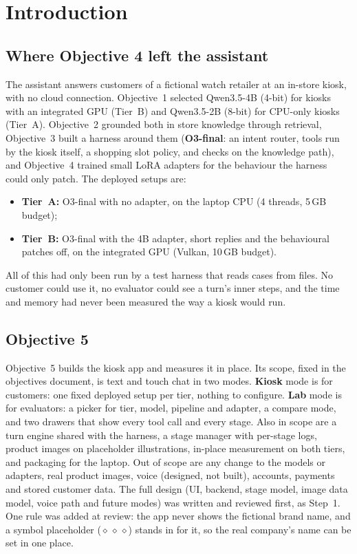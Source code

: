 \documentclass[11pt,a4paper]{article}
\newcommand{\brand}{$\diamond\,\diamond\,\diamond$}
\begin{document}
\section{Introduction}\label{sec:intro}

\subsection{Where Objective 4 left the assistant}
The assistant answers customers of a fictional watch retailer at an in-store kiosk, with no cloud connection. Objective~1
selected Qwen3.5-4B (4-bit) for kiosks with an integrated GPU (Tier~B) and Qwen3.5-2B (8-bit) for CPU-only kiosks
(Tier~A). Objective~2 grounded both in store knowledge through retrieval, Objective~3 built a harness around them
(\textbf{O3-final}: an intent router, tools run by the kiosk itself, a shopping slot policy, and checks on the knowledge
path), and Objective~4 trained small LoRA adapters for the behaviour the harness could only patch. The deployed setups are:
\begin{itemize}
  \item \textbf{Tier~A:} O3-final with no adapter, on the laptop CPU (4 threads, 5\,GB budget);
  \item \textbf{Tier~B:} O3-final with the 4B adapter, short replies and the behavioural patches off, on the integrated
        GPU (Vulkan, 10\,GB budget).
\end{itemize}
All of this had only been run by a test harness that reads cases from files. No customer could use it, no evaluator
could see a turn's inner steps, and the time and memory had never been measured the way a kiosk would run.

\subsection{Objective 5}
Objective~5 builds the kiosk app and measures it in place. Its scope, fixed in the objectives document, is text and touch
chat in two modes. \textbf{Kiosk} mode is for customers: one fixed deployed setup per tier, nothing to configure.
\textbf{Lab} mode is for evaluators: a picker for tier, model, pipeline and adapter, a compare mode, and two drawers that
show every tool call and every stage. Also in scope are a turn engine shared with the harness, a stage manager with
per-stage logs, product images on placeholder illustrations, in-place measurement on both tiers, and packaging for the
laptop. Out of scope are any change to the models or adapters, real product images, voice (designed, not built),
accounts, payments and stored customer data. The full design (UI, backend, stage model, image data model, voice path and
future modes) was written and reviewed first, as Step~1. One rule was added at review: the app never shows the fictional
brand name, and a symbol placeholder (\brand) stands in for it, so the real company's name can be set in one place.
\end{document}
